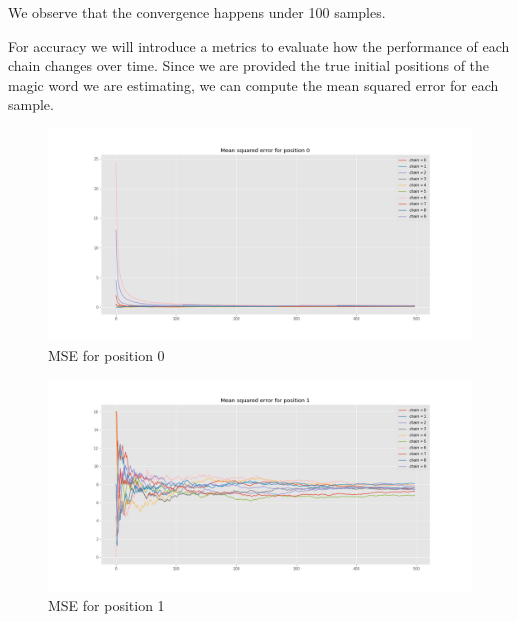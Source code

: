 \documentclass[]{article}
\begin{document}
	We observe that the convergence happens under 100 samples.
	
	For accuracy we will introduce a metrics to evaluate how the performance of each chain changes over time. Since we are provided the true initial positions of the magic word we are estimating, we can compute the mean squared error for each sample.
	
	\begin{figure}[H]
		\begin{center}
			
			\includegraphics[width=1\textwidth]{task4/figures/T_2_4/Q2/mse_pos0.png}
			\caption*{MSE for position 0}
		\end{center}
	\end{figure}
	
	\begin{figure}[H]
		\begin{center}
			
			\includegraphics[width=1\textwidth]{task4/figures/T_2_4/Q2/mse_pos1.png}
			\caption*{MSE for position 1}
		\end{center}
	\end{figure}
	
\end{document}
